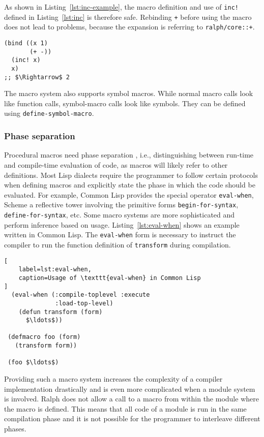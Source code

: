 \documentclass{acm_proc_article-sp}
\begin{document}
As shown in Listing~\ref{lst:inc-example}, the macro definition and
use of \texttt{inc!} defined in Listing~\ref{lst:inc} is therefore
safe. Rebinding \texttt{+} before using the macro does not lead to
problems, because the expansion is referring to \texttt{ralph/core::+}.

\begin{lstlisting}[caption=Use of macro \texttt{inc!},label=lst:inc-example]
(bind ((x 1)
       (+ -))
  (inc! x)
  x)
;; $\Rightarrow$ 2
\end{lstlisting}

The macro system also supports symbol macros. While normal macro calls
look like function calls, symbol-macro calls look like symbols. They
can be defined using \texttt{define-symbol-macro}.

\subsubsection{Phase separation}

Procedural macros need phase separation \cite{flatt2002}, i.e.,
distinguishing between run-time and compile-time evaluation of code,
as macros will likely refer to other definitions. Most Lisp
dialects require the programmer to follow certain protocols when
defining macros and explicitly state the phase in which the code
should be evaluated. For example, Common Lisp provides the special
operator \texttt{eval-when}, Scheme a reflective tower involving the
primitive forms \texttt{begin-for-syntax}, \texttt{define-for-syntax},
etc. Some macro systems are more sophisticated and perform inference
based on usage. Listing~\ref{lst:eval-when} shows an example written
in Common Lisp. The \texttt{eval-when} form is necessary to instruct
the compiler to run the function definition of \texttt{transform}
during compilation.

\begin{lstlisting}[
    label=lst:eval-when,
    caption=Usage of \texttt{eval-when} in Common Lisp
]
  (eval-when (:compile-toplevel :execute
              :load-top-level)
    (defun transform (form)
      $\ldots$))

 (defmacro foo (form)
   (transform form))

 (foo $\ldots$)
\end{lstlisting}

Providing such a macro system increases the complexity of a compiler
implementation drastically and is even more complicated when a module
system is involved. Ralph does not allow a call to a macro from within
the module where the macro is defined. This means that all code of a
module is run in the same compilation phase and it is not possible for
the programmer to interleave different phases.
\end{document}
